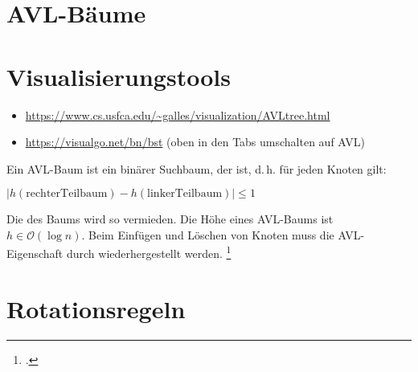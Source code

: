 \documentclass{lehramt-informatik-haupt}
\begin{document}

\section{AVL-Bäume}

\begin{quellen}
\item \cite{wiki:avl-baum}
\item \cite[Kapitel 14.4.2, Seite 378-386 (PDF 394-402)]{saake}
\item \cite[bst]{net:html:visualgo}
\end{quellen}

%

\section{Visualisierungstools}

\begin{itemize}
\item \url{https://www.cs.usfca.edu/~galles/visualization/AVLtree.html}
\item \url{https://visualgo.net/bn/bst} (oben in den Tabs umschalten auf AVL)
\end{itemize}

\noindent
Ein AVL-Baum ist ein binärer Suchbaum, der  ist,
d.\,h. für jeden Knoten gilt:

\begin{center}
$|h(\text{rechterTeilbaum}) - h(\text{linkerTeilbaum})| \leq 1$
\end{center}

\noindent
Die  des Baums wird so vermieden. Die Höhe eines
AVL-Baums ist $h \in \mathcal{O}(\log n)$. Beim Einfügen und Löschen von
Knoten muss die AVL-Eigenschaft durch 
wiederhergestellt werden.
\footcite[Seite 22 (PDF 16)]{aud:fs:5}

%

\section{Rotationsregeln}
\end{document}
